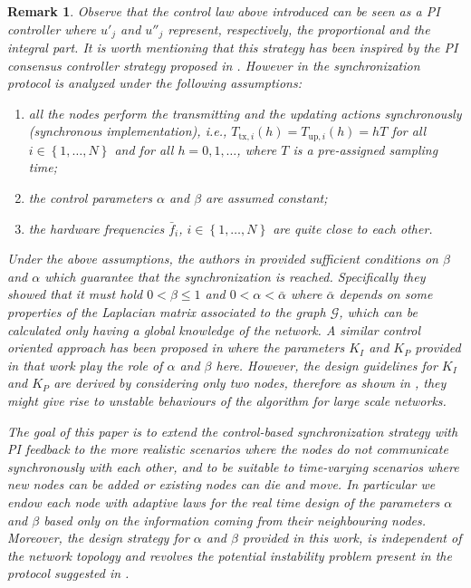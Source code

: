\documentclass[english,a4paper,10pt,final]{article}
\numberwithin{equation}{section}
\numberwithin{figure}{section}
\newtheorem{remark}{Remark}
\begin{document}
\begin{remark}
Observe that the control law above introduced can be seen as a PI controller where $u'_j$ and $u''_j$ represent, respectively, the proportional and the integral part. It is worth mentioning that this strategy has been inspired by the PI consensus controller strategy proposed in \cite{Carli_2011}. However in \cite{Carli_2011} the synchronization protocol is analyzed under the following assumptions:
\begin{enumerate}
\item all the nodes perform the transmitting and the updating actions synchronously (\emph{synchronous implementation}), i.e., $T_{\mathrm{tx},i}(h)=T_{\mathrm{up},i}(h)=hT$ for all $i \in \left\{1,\ldots,N\right\}$ and for all $h=0,1,\ldots$, where $T$ is a pre-assigned sampling time;
\item the control parameters $\alpha$ and $\beta$ are assumed constant;
\item the hardware frequencies $\bar{f}_i$, $i \in \left\{1,\ldots,N\right\}$ are quite close to each other.
\end{enumerate}

Under the above assumptions, the authors in \cite{Carli_2011} provided sufficient conditions on $\beta$ and $\alpha$ which guarantee that the synchronization is reached. Specifically they showed that it must hold $0< \beta \leq 1$ and $0 < \alpha < \bar{\alpha}$ where $\bar{\alpha}$ depends on some properties of the Laplacian matrix associated to the graph $\mathcal{G}$, which can be calculated only having a global knowledge of the network. A similar control oriented approach has been proposed in \cite{Chen:10} where the parameters $K_I$ and $K_P$ provided in that work  play the role of $\alpha$ and $\beta$ here. However, the design guidelines for  $K_I$ and $K_P$ are derived by considering only two nodes, therefore as shown in \cite{Carli_2011}, they might give rise to unstable behaviours of the algorithm for large scale networks. 

The goal of this paper is to extend the control-based synchronization strategy with PI feedback to the more realistic scenarios where the nodes do not communicate synchronously with each other, and to be suitable to time-varying scenarios where new nodes can be added or existing nodes can die and move. In particular we endow each node with adaptive laws for  the real time design of the parameters $\alpha$ and $\beta$ based only on the information coming from their neighbouring nodes. Moreover, the design strategy for $\alpha$ and $\beta$ provided in this work, is independent of the network topology and revolves the potential instability problem present in the protocol suggested in \cite{Chen:10}.

\end{remark}
\end{document}
